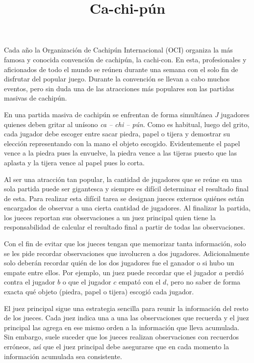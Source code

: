 \documentclass{oci}
\title{Ca-chi-pún}
\begin{document}
\begin{problemDescription}
  Cada año la Organización de Cachipún Internacional (OCI) organiza la
  más famosa y conocida convención de cachipún, la cachi-con.
  En esta, profesionales y aficionados de todo el mundo se reúnen durante una
  semana con el solo fin de disfrutar del popular juego.
  Durante la convención se llevan a cabo muchos eventos, pero sin duda una de
  las atracciones más populares son las partidas masivas de cachipún.

  En una partida masiva de cachipún se enfrentan de forma simultánea $J$
  jugadores quienes deben gritar al unísono {\it ca -- chi -- pún}.
  Como es habitual, luego del grito, cada jugador debe escoger entre sacar
  piedra, papel o tijera y demostrar su elección representando con la mano
  el objeto escogido.
  Evidentemente el papel vence a la piedra pues la envuelve, la piedra vence a
  las tijeras puesto que las aplasta y la tijera vence al papel pues lo corta.

  Al ser una atracción tan popular, la cantidad de jugadores que se reúne en una
  sola partida puede ser gigantesca y siempre es difícil determinar el
  resultado final de esta.
  Para realizar esta difícil tarea se designan jueces externos quiénes
  están encargados de observar a una cierta cantidad de jugadores.
  Al finalizar la partida, los jueces reportan sus observaciones a un juez
  principal quien tiene la responsabilidad de calcular el resultado final a
  partir de todas las observaciones.

  Con el fin de evitar que los jueces tengan que memorizar tanta información,
  solo se les pide recordar observaciones que involucren a dos jugadores.
  Adicionalmente solo deberán recordar quién de los dos jugadores fue el ganador
  o si hubo un empate entre ellos.
  Por ejemplo, un juez puede recordar que el jugador $a$ perdió contra el
  jugador $b$ o que el jugador $c$ empató con el $d$, pero no saber de forma
  exacta qué objeto (piedra, papel o tijera) escogió cada jugador.

  El juez principal sigue una estrategia sencilla para reunir la información del
  resto de los jueces.
  Cada juez indica una a una las observaciones que recuerda y el juez principal
  las agrega en ese mismo orden a la información que lleva acumulada.
  Sin embargo, suele suceder que los jueces realizan observaciones con recuerdos
  erróneos, así que el juez principal debe asegurarse que en cada momento la
  información acumulada sea consistente.


\end{problemDescription}
\end{document}
